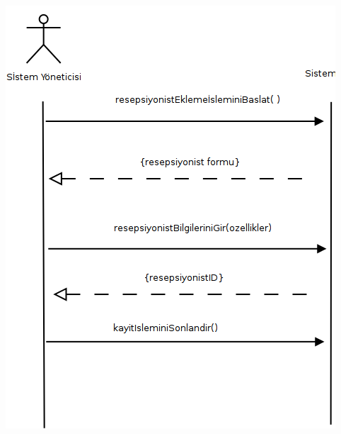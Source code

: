 \documentclass[12pt,a4paper]{report}
\begin{document}
\newpage

\begin{center}
\includegraphics{dia/ssd-usecase5.png}
\end{center}

\newpage
\end{document}

